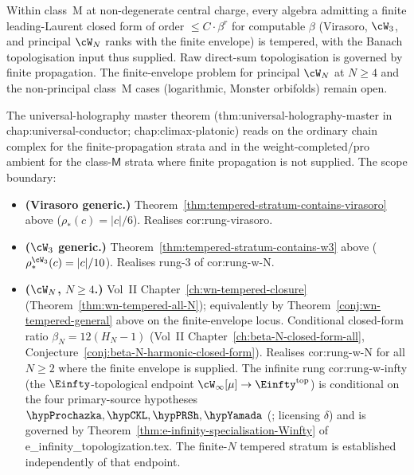 Within class~M at non-degenerate central charge, every algebra
admitting a finite leading-Laurent closed form of order
$\le C \cdot \beta^r$ for computable $\beta$ (Virasoro, $\cW_3$, and
principal $\cW_N$ ranks with the finite envelope) is tempered, with the
Banach topologisation input thus supplied. Raw direct-sum
topologisation is governed by finite propagation. The
finite-envelope problem for principal $\cW_N$ at $N\ge4$ and the
non-principal class~M cases (logarithmic, Monster orbifolds) remain
open.

\begin{remark}%
\label{rem:anchor-tempered-stratum-master}%
%
%
%
The universal-holography master theorem
(\textsf{thm:universal-holography-master} in
\textsf{chap:universal-conductor}; \textsf{chap:climax-platonic})
reads on the ordinary chain complex for the finite-propagation strata
and in the weight-completed/pro ambient for the class-\(\mathsf M\)
strata where finite propagation is not supplied. The scope boundary:
\begin{itemize}[nosep]
\item \textbf{(Virasoro generic.)}
 Theorem~\ref{thm:tempered-stratum-contains-virasoro} above
 ($\rho_*(c) = |c|/6$). Realises \textsf{cor:rung-virasoro}.
\item \textbf{($\cW_3$ generic.)}
 Theorem~\ref{thm:tempered-stratum-contains-w3} above
 ($\rho_*^{\cW_3}(c) = |c|/10$). Realises rung-3 of
 \textsf{cor:rung-w-N}.
\item \textbf{($\cW_N$, $N \ge 4$.)}
 Vol~II Chapter~\ref{ch:wn-tempered-closure}
 (Theorem~\ref{thm:wn-tempered-all-N}); equivalently by
 Theorem~\ref{conj:wn-tempered-general} above on the finite-envelope
 locus. Conditional closed-form ratio
 $\beta_N = 12(H_N - 1)$ (Vol~II
 Chapter~\ref{ch:beta-N-closed-form-all},
 Conjecture~\ref{conj:beta-N-harmonic-closed-form}). Realises
 \textsf{cor:rung-w-N} for all $N \ge 2$ where the finite envelope is
 supplied. The infinite rung \textsf{cor:rung-w-infty}
 (the $\Einfty$-topological endpoint $\cW_\infty[\mu]\to\Einfty^{\mathrm{top}}$)
 is conditional on the four primary-source hypotheses
 $\hypProchazka, \hypCKL, \hypPRSh, \hypYamada$
 (\cite{ProchazkaRapcak18,CKL-parafermion,PopeRomansShen-winfty-wedge,
 Bakas-Winfty,Yamada}; licensing $\delta$) and is governed by
 Theorem~\textup{\ref{thm:e-infinity-specialisation-Winfty}} of
 \textsf{e\_infinity\_topologization.tex}. The finite-$N$ tempered
 stratum is established independently of that endpoint.

\end{itemize}
\end{remark}
